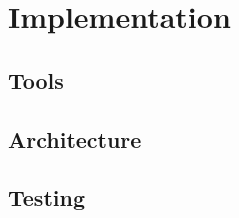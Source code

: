 \chapter{Implementation}
\label{sec:implementation}

\section{Tools}
\section{Architecture}
\section{Testing}
